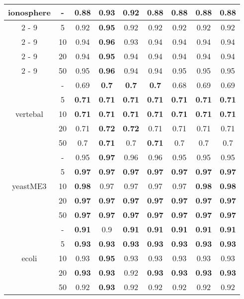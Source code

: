 \documentclass{article}%
\begin{document}
\begin{tabular}{c|c|ccccccc}
\hline%
\multirow{5}{*}{ionosphere}&{-}&0.88&\textbf{0.93}&0.92&0.88&0.88&0.88&0.88\\%
\cline{2%
-%
9}%
&5&0.92&\textbf{0.95}&0.92&0.92&0.92&0.92&0.92\\%
\cline{2%
-%
9}%
&10&0.94&\textbf{0.96}&0.93&0.94&0.94&0.94&0.94\\%
\cline{2%
-%
9}%
&20&0.94&\textbf{0.95}&0.94&0.94&0.94&0.94&0.94\\%
\cline{2%
-%
9}%
&50&0.95&\textbf{0.96}&0.94&0.94&0.95&0.95&0.95\\%
\hline%
\multirow{5}{*}{vertebal}&{-}&0.69&\textbf{0.7}&\textbf{0.7}&\textbf{0.7}&0.68&0.69&0.69\\%
\cline{2%
-%
9}%
&5&\textbf{0.71}&\textbf{0.71}&\textbf{0.71}&\textbf{0.71}&\textbf{0.71}&\textbf{0.71}&\textbf{0.71}\\%
\cline{2%
-%
9}%
&10&\textbf{0.71}&\textbf{0.71}&\textbf{0.71}&\textbf{0.71}&\textbf{0.71}&\textbf{0.71}&\textbf{0.71}\\%
\cline{2%
-%
9}%
&20&0.71&\textbf{0.72}&\textbf{0.72}&0.71&0.71&0.71&0.71\\%
\cline{2%
-%
9}%
&50&0.7&\textbf{0.71}&0.7&\textbf{0.71}&0.7&0.7&0.7\\%
\hline%
\multirow{5}{*}{yeastME3}&{-}&0.95&\textbf{0.97}&0.96&0.96&0.95&0.95&0.95\\%
\cline{2%
-%
9}%
&5&\textbf{0.97}&\textbf{0.97}&\textbf{0.97}&\textbf{0.97}&\textbf{0.97}&\textbf{0.97}&\textbf{0.97}\\%
\cline{2%
-%
9}%
&10&\textbf{0.98}&0.97&0.97&0.97&0.97&\textbf{0.98}&\textbf{0.98}\\%
\cline{2%
-%
9}%
&20&\textbf{0.97}&\textbf{0.97}&\textbf{0.97}&\textbf{0.97}&\textbf{0.97}&\textbf{0.97}&\textbf{0.97}\\%
\cline{2%
-%
9}%
&50&\textbf{0.97}&\textbf{0.97}&\textbf{0.97}&\textbf{0.97}&\textbf{0.97}&\textbf{0.97}&\textbf{0.97}\\%
\hline%
\multirow{5}{*}{ecoli}&{-}&\textbf{0.91}&0.9&\textbf{0.91}&\textbf{0.91}&\textbf{0.91}&\textbf{0.91}&\textbf{0.91}\\%
\cline{2%
-%
9}%
&5&\textbf{0.93}&\textbf{0.93}&\textbf{0.93}&\textbf{0.93}&\textbf{0.93}&\textbf{0.93}&\textbf{0.93}\\%
\cline{2%
-%
9}%
&10&0.93&\textbf{0.95}&0.93&0.93&0.93&0.93&0.93\\%
\cline{2%
-%
9}%
&20&\textbf{0.93}&\textbf{0.93}&0.92&\textbf{0.93}&\textbf{0.93}&\textbf{0.93}&\textbf{0.93}\\%
\cline{2%
-%
9}%
&50&0.92&\textbf{0.93}&0.92&0.92&0.92&0.92&0.92\\%

\end{tabular}
\end{document}
